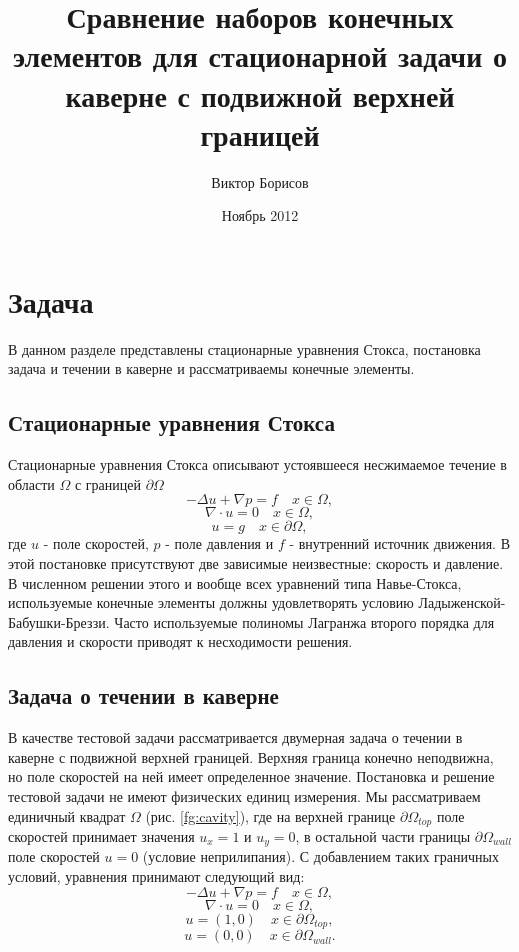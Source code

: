 \documentclass[12pt]{article}
\title{Сравнение наборов конечных элементов для стационарной задачи о каверне с подвижной верхней границей}
\date{Ноябрь 2012}
\author{Виктор Борисов}
\begin{document}
\maketitle

\section{Задача}
В данном разделе представлены стационарные уравнения Стокса, 
постановка задача и течении в каверне и рассматриваемы конечные элементы.
\subsection{Стационарные уравнения Стокса}
Стационарные уравнения Стокса описывают устоявшееся несжимаемое течение в области $\Omega$ с границей $\partial\Omega$
\begin{equation}
-\Delta u + \nabla p = f \quad x \in \Omega,
\end{equation}
\begin{equation}
\nabla\cdot u = 0 \quad x \in \Omega,
\end{equation}
\begin{equation}
u = g \quad x \in \partial\Omega,
\end{equation}
где $u$ - поле скоростей, $p$ - поле давления и $f$ - внутренний источник движения.
В этой постановке присутствуют две зависимые неизвестные: скорость и давление.
В численном решении этого и вообще всех уравнений типа Навье-Стокса, используемые конечные элементы должны удовлетворять условию Ладыженской-Бабушки-Бреззи. Часто используемые полиномы Лагранжа второго порядка для давления и скорости приводят к несходимости решения.

\subsection{Задача о течении в каверне}
В качестве тестовой задачи рассматривается двумерная задача о течении в каверне с подвижной верхней границей. Верхняя граница конечно неподвижна, но поле скоростей на ней имеет определенное значение. Постановка и решение тестовой задачи не имеют физических единиц измерения. Мы рассматриваем единичный квадрат $\Omega$ (рис. \ref{fg:cavity}), где на верхней границе $\partial\Omega_{top}$ поле скоростей принимает значения $u_x=1$ и $u_y=0$, в остальной части границы $\partial\Omega_{wall}$ поле скоростей $u=0$ (условие неприлипания).
С добавлением таких граничных условий, уравнения принимают следующий вид:
\begin{equation}
-\Delta u + \nabla p = f \quad x \in \Omega,
\end{equation}
\begin{equation}
\nabla\cdot u = 0 \quad x \in \Omega,
\end{equation}
\begin{equation}
u = (1, 0) \quad x \in \partial\Omega_{top},
\end{equation}
\begin{equation}
u = (0, 0) \quad x \in \partial\Omega_{wall}.
\end{equation}
\end{document}
